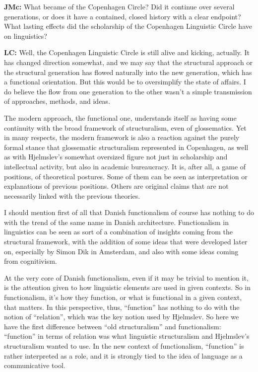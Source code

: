 \textbf{JMc:} What became of the Copenhagen Circle? Did it continue over several generations, or does it have a contained, closed history with a clear endpoint? What lasting effects did the scholarship of the Copenhagen Linguistic Circle have on linguistics?

\textbf{LC:} Well, the Copenhagen Linguistic Circle is still alive and kicking, actually. It has changed direction somewhat, and we may say that the structural approach or the structural generation has flowed naturally into the new generation, which has a functional orientation. But this would be to oversimplify the state of affairs. I do believe the flow from one generation to the other wasn’t a simple transmission of approaches, methods, and ideas. 

The modern approach, the functional one, understands itself as having some continuity with the broad framework of structuralism, even of glossematics. Yet in many respects, the modern framework is also a reaction against the purely formal stance that glossematic structuralism represented in Copenhagen, as well as with Hjelmslev’s somewhat oversized figure not just in scholarship and intellectual activity, but also in academic bureaucracy. It is, after all, a game of positions, of theoretical postures. Some of them can be seen as interpretation or explanations of previous positions. Others are original claims that are not necessarily linked with the previous theories. 

I should mention first of all that Danish functionalism of course has nothing to do with the trend of the same name in Danish architecture. Functionalism in linguistics can be seen as sort of a combination of insights coming from the structural framework, with the addition of some ideas that were developed later on, especially by Simon Dik in Amsterdam, and also with some ideas coming from cognitivism. 

At the very core of Danish functionalism, even if it may be trivial to mention it, is the attention given to how linguistic elements are used in given contexts. So in functionalism, it’s how they function, or what is functional in a given context, that matters. In this perspective, thus, “function” has nothing to do with the notion of “relation”, which was the key notion used by Hjelmslev. So here we have the first difference between “old structuralism” and functionalism: “function” in terms of relation was what linguistic structuralism and Hjelmslev’s structuralism wanted to use. In the new context of functionalism, “function” is rather interpreted as a role, and it is strongly tied to the idea of language as a communicative tool. 

